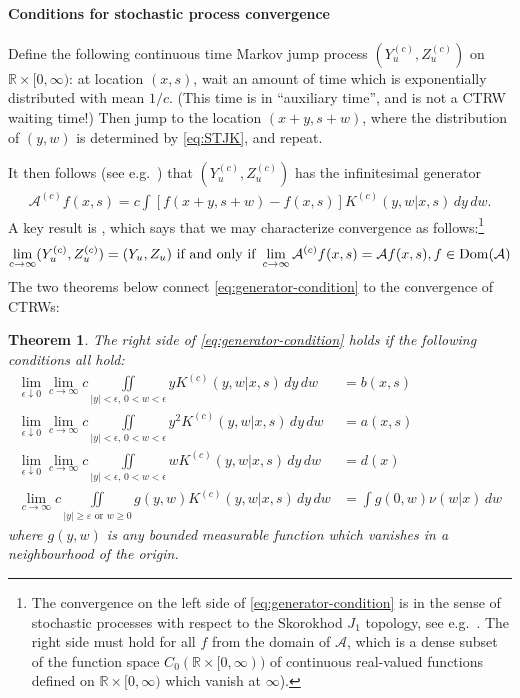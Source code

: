 \documentclass[a4paper,12pt]{elsarticle}
\numberwithin{equation}{section}
\theoremstyle{plain}
\newtheorem{theorem}{Theorem}[section]
\theoremstyle{definition}
\theoremstyle{remark}
\numberwithin{equation}{section}
\newcommand{\spc}{\mathbb R}
\newcommand{\spctim}{\spc \times [0,\infty)}
\newcommand{\1}{\mathbf 1}
\begin{document}
\paragraph{Conditions for stochastic process convergence}
Define the following continuous time Markov jump process $(Y^{(c)}_u, Z^{(c)}_u)$ on 
$\spctim$: at location $(x,s)$, wait an amount of time which is exponentially distributed with mean $1/c$. (This time is in ``auxiliary time'', and is not a CTRW waiting time!) Then jump to the location $(x+y, s+w)$, where the distribution of $(y,w)$ is determined by \eqref{eq:STJK}, and repeat. 

It then follows (see e.g.\ \citep[Proposition 17.2]{Kallenberg}) that 
$(Y^{(c)}_u, Z^{(c)}_u)$ has the infinitesimal generator
\begin{align} \label{eq:jump-process-generator}
\mathcal A^{(c)} f(x,s) = c \int [f(x+y, s+w) - f(x,s)] K^{(c)}(y,w | x,s)\,dy\,dw.
\end{align}
A key result is \citep[Theorem 17.25]{Kallenberg}, which says that we may characterize convergence as follows:\footnote{The convergence on the left side of \eqref{eq:generator-condition} is in the sense of stochastic processes with respect to the Skorokhod $J_1$ topology, see e.g.\ \citep{Whitt2010}. The right side must hold for all $f$ from the domain of $\mathcal A$, which is a dense subset of the function space $C_0(\spctim)$ of continuous real-valued functions defined on $\spctim$ which vanish at $\infty$).}
\begin{align} \label{eq:generator-condition}
\lim_{c \to \infty}(Y^{(c)}_u, Z^{(c)}_u) = (Y_u, Z_u)
\text{ if and only if }
\lim_{c \to \infty} \mathcal A^{(c)}f(x,s) = \mathcal A f(x,s), 
f \in {\rm Dom}(\mathcal A)
\end{align}
The two theorems below connect \eqref{eq:generator-condition} to the convergence of CTRWs: 

\begin{theorem} \label{theorem1}
The right side of \eqref{eq:generator-condition} holds if the following 
conditions all hold: 
\begin{align} \label{eq:cond1}
\lim_{\epsilon \downarrow 0} \lim_{c \to \infty}
c \iint\limits_{|y|< \epsilon,\,0<  w < \epsilon} y K^{(c)}(y,w | x,s)\,dy\,dw &= b(x,s)
\\ \label{eq:cond2}
\lim_{\epsilon \downarrow 0} \lim_{c \to \infty}
c \iint\limits_{|y|< \epsilon, \,0<w < \epsilon} y^2 K^{(c)}(y,w | x,s)\,dy\,dw &= a(x,s)
\\ \label{eq:cond3}
\lim_{\epsilon \downarrow 0} \lim_{c \to \infty}
c \iint\limits_{|y|< \epsilon, \,0<w < \epsilon} w K^{(c)}(y,w | x,s)\,dy\,dw &= d(x)
\\
\label{eq:cond4}
\lim_{c \to \infty}
c \iint\limits_{|y| \ge \varepsilon \text{ or } w \ge 0} g(y,w) K^{(c)} (y,w | x,s)\,dy\,dw &= \int g(0,w) \nu(w|x)\,dw
\end{align}
where $g(y,w)$ is any bounded measurable function which vanishes in a neighbourhood of the origin. 
\end{theorem}
\end{document}
